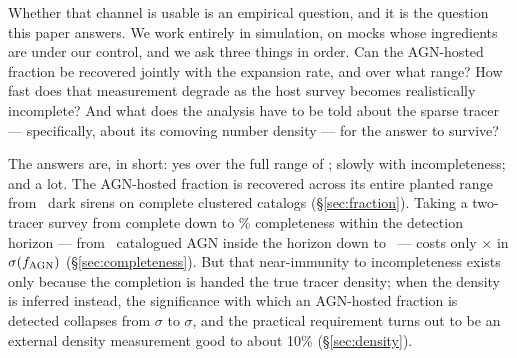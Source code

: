 Whether that channel is usable is an empirical question, and it is the question
this paper answers. We work entirely in simulation, on mocks whose ingredients
are under our control, and we ask three things in order. Can the AGN-hosted
fraction be recovered jointly with the expansion rate, and over what range?
How fast does that measurement degrade as the host survey becomes realistically
incomplete? And what does the analysis have to be told about the sparse tracer
--- specifically, about its comoving number density --- for the answer to
survive?

The answers are, in short: yes over the full range of \fagn; slowly with
incompleteness; and a lot. The AGN-hosted fraction is recovered across its
entire planted range from \GlassNobs\ dark sirens on complete clustered
catalogs (\S\ref{sec:fraction}). Taking a two-tracer survey from complete down
to \IncMeighteenCPct\% completeness within the detection horizon --- from
\IncCompleteAgnInHorizon\ catalogued AGN inside the horizon down to
\IncMeighteenAgnInHorizon\ --- costs only \IncFacFMax$\times$ in
$\sigma(f_{\rm AGN})$ (\S\ref{sec:completeness}). But that near-immunity to
incompleteness exists only because the completion is handed the true tracer
density; when the density is inferred instead, the significance with which an
AGN-hosted fraction is detected collapses from \FreeCompleteExactSig$\sigma$ to
\FreeMeighteenFreeSig$\sigma$, and the practical requirement turns out to be an
external density measurement good to about 10\% (\S\ref{sec:density}).

